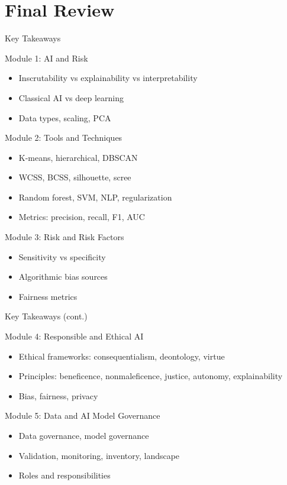 \documentclass[aspectratio=169,8pt]{beamer}
\begin{document}
	\section{Final Review}
	
	\begin{frame}{Key Takeaways}
		\begin{block}{Module 1: AI and Risk}
			\begin{itemize}
				\item Inscrutability vs explainability vs interpretability
				\item Classical AI vs deep learning
				\item Data types, scaling, PCA
			\end{itemize}
		\end{block}
		\begin{block}{Module 2: Tools and Techniques}
			\begin{itemize}
				\item K-means, hierarchical, DBSCAN
				\item WCSS, BCSS, silhouette, scree
				\item Random forest, SVM, NLP, regularization
				\item Metrics: precision, recall, F1, AUC
			\end{itemize}
		\end{block}
		\begin{block}{Module 3: Risk and Risk Factors}
			\begin{itemize}
				\item Sensitivity vs specificity
				\item Algorithmic bias sources
				\item Fairness metrics
			\end{itemize}
		\end{block}
	\end{frame}
	
	\begin{frame}{Key Takeaways (cont.)}
		\begin{block}{Module 4: Responsible and Ethical AI}
			\begin{itemize}
				\item Ethical frameworks: consequentialism, deontology, virtue
				\item Principles: beneficence, nonmaleficence, justice, autonomy, explainability
				\item Bias, fairness, privacy
			\end{itemize}
		\end{block}
		\begin{block}{Module 5: Data and AI Model Governance}
			\begin{itemize}
				\item Data governance, model governance
				\item Validation, monitoring, inventory, landscape
				\item Roles and responsibilities
			\end{itemize}
		\end{block}
	\end{frame}
	
	


	
\end{document}
